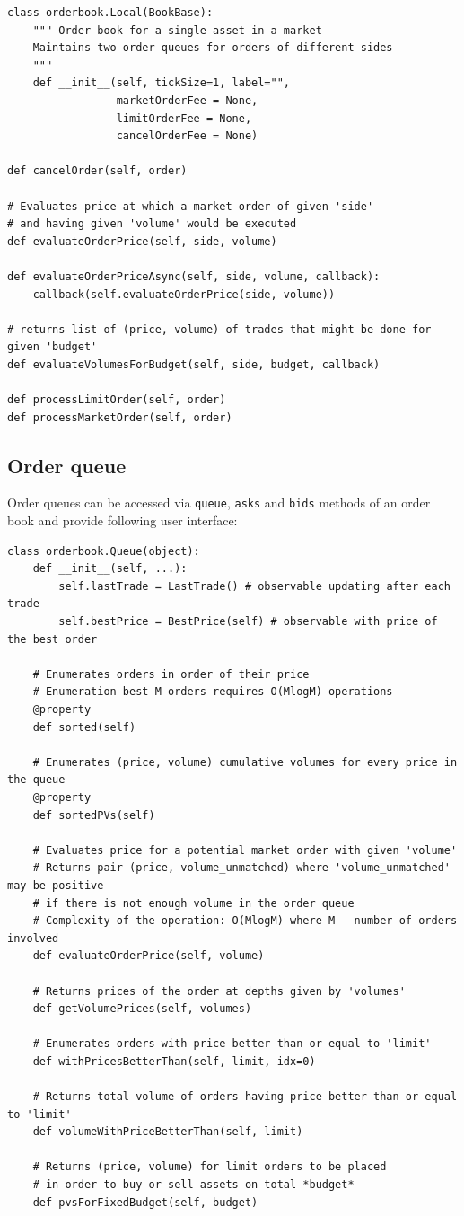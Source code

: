 \documentclass[a4paper,11pt]{article}
\begin{document}
\begin{verbatim}
class orderbook.Local(BookBase):
    """ Order book for a single asset in a market
    Maintains two order queues for orders of different sides
    """
    def __init__(self, tickSize=1, label="",
                 marketOrderFee = None,
                 limitOrderFee = None,
                 cancelOrderFee = None)

def cancelOrder(self, order)

# Evaluates price at which a market order of given 'side' 
# and having given 'volume' would be executed
def evaluateOrderPrice(self, side, volume)

def evaluateOrderPriceAsync(self, side, volume, callback):
    callback(self.evaluateOrderPrice(side, volume))

# returns list of (price, volume) of trades that might be done for given 'budget'
def evaluateVolumesForBudget(self, side, budget, callback)

def processLimitOrder(self, order)
def processMarketOrder(self, order)
\end{verbatim}

\subsection{Order queue}\label{order-queue}

Order queues can be accessed via \texttt{queue}, \texttt{asks} and
\texttt{bids} methods of an order book and provide following user
interface:

\begin{verbatim}
class orderbook.Queue(object):
    def __init__(self, ...):
        self.lastTrade = LastTrade() # observable updating after each trade
        self.bestPrice = BestPrice(self) # observable with price of the best order

    # Enumerates orders in order of their price
    # Enumeration best M orders requires O(MlogM) operations
    @property
    def sorted(self)

    # Enumerates (price, volume) cumulative volumes for every price in the queue
    @property
    def sortedPVs(self)

    # Evaluates price for a potential market order with given 'volume'
    # Returns pair (price, volume_unmatched) where 'volume_unmatched' may be positive
    # if there is not enough volume in the order queue
    # Complexity of the operation: O(MlogM) where M - number of orders involved
    def evaluateOrderPrice(self, volume)

    # Returns prices of the order at depths given by 'volumes'
    def getVolumePrices(self, volumes)

    # Enumerates orders with price better than or equal to 'limit'
    def withPricesBetterThan(self, limit, idx=0)

    # Returns total volume of orders having price better than or equal to 'limit'
    def volumeWithPriceBetterThan(self, limit)

    # Returns (price, volume) for limit orders to be placed
    # in order to buy or sell assets on total *budget*
    def pvsForFixedBudget(self, budget)
\end{verbatim}
\end{document}
